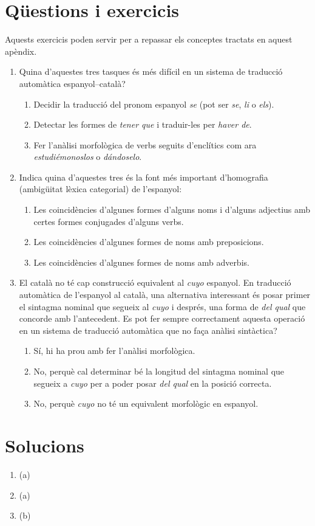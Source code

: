 \section{Qüestions i exercicis}
Aquests exercicis poden servir per a repassar els conceptes tractats en aquest apèndix.
\begin{enumerate}
\item Quina d'aquestes tres tasques és més difícil en un sistema de
  traducció automàtica espanyol--català?
\begin{enumerate}
\item Decidir la traducció del pronom espanyol \emph{se} (pot ser \emph{se},
\emph{li} o \emph{els}).
\item Detectar les formes de \emph{tener que} i traduir-les per \emph{haver de}.
\item Fer l'anàlisi morfològica de verbs seguits d'enclítics 
com ara \emph{estudiémonoslos} o \emph{dándoselo}.
\end{enumerate}

\item Indica quina d'aquestes tres 
és la font més important d'homografia (ambigüitat lèxica
categorial) de l'espanyol:
\begin{enumerate}
\item Les coincidències d'algunes formes d'alguns  
noms i d'alguns adjectius amb certes formes conjugades d'alguns verbs.
\item Les coincidències d'algunes formes de noms amb preposicions.
\item Les coincidències d'algunes formes de noms amb adverbis.
\end{enumerate}

\item El català no té cap construcció equivalent al \emph{cuyo}
  espanyol. En traducció automàtica de l'espanyol al català, una
  alternativa interessant és posar primer el sintagma nominal que
  segueix al \emph{cuyo} i després, una forma de \emph{del
    qual} que concorde amb l'antecedent. Es pot fer sempre
  correctament aquesta operació 
  en un sistema de traducció automàtica que no faça anàlisi
  sintàctica?
\begin{enumerate}
\item Sí, hi ha prou amb fer l'anàlisi morfològica.
\item No, perquè cal determinar bé la longitud del sintagma nominal
  que segueix a \emph{cuyo} per a poder posar \emph{del qual} en la
  posició correcta.
\item No, perquè \emph{cuyo} no té un equivalent morfològic en
  espanyol.
\end{enumerate}



\end{enumerate}

\section{Solucions}
\begin{enumerate}
\item (a)
\item (a)
\item (b)


\end{enumerate}
